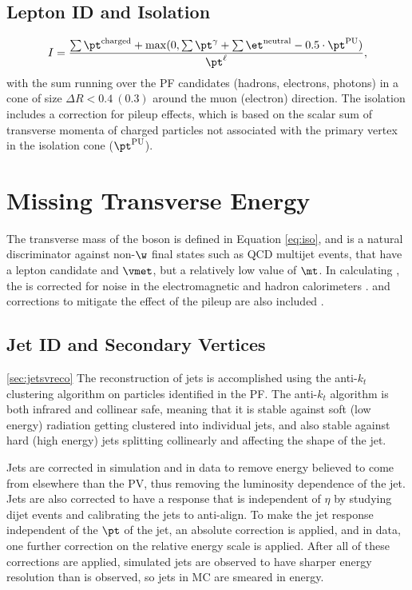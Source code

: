 \subsection{Lepton ID and Isolation}

\begin{equation}
\label{eq:iso}
I =\frac{ \sum\pt^{\mathrm{charged}}+{\mathrm{max}}(0,\sum\pt^{\gamma}+\sum\et^{\mathrm{neutral}}-0.5\cdot\pt^{\mathrm{PU}})}{\pt^\ell},
\end{equation}
 with the sum running over the PF candidates (hadrons, electrons, photons)
 in a cone of size $\Delta R < 0.4~(0.3)$ around the muon (electron) direction.
The isolation includes a correction for pileup effects,
 which is based on the scalar sum of transverse momenta of charged particles
 not associated with the primary vertex in the isolation cone 
 ($\pt^{\mathrm{PU}}$).


\section{Missing Transverse Energy}

The transverse mass of the \w boson
 is defined in Equation \ref{eq:iso},
 and is a  natural discriminator against non-$\w$ final states
 such as QCD multijet events,
 that have a lepton candidate and $\vmet$,
 but a relatively low value of $\mt$.
In calculating \mt, the \met is corrected for noise in the
 electromagnetic and hadron calorimeters \cite{WZCMS:2010}.
 and corrections to mitigate the effect of the
 pileup are also included \cite{CMS:8TeVMET}.


\subsection{Jet ID and Secondary Vertices}\ref{sec:jetsvreco}
 The reconstruction
  of jets is accomplished using the anti-$k_t$
  clustering algorithm on particles identified 
  in the PF. 
 The anti-$k_t$ algorithm is both infrared and collinear
  safe, meaning that it is stable against 
  soft (low energy) radiation getting clustered into individual jets, and 
  also stable against hard (high energy) jets splitting
  collinearly and affecting the shape of the jet.
 
 Jets are corrected in simulation and in data to remove
  energy believed to come from elsewhere than the PV, 
  thus removing the luminosity dependence of the jet.
 Jets are also corrected to have a response that is
  independent of $\eta$ by studying dijet events
  and calibrating the jets to anti-align.
 To make the jet response independent of the $\pt$
  of the jet, an absolute correction is applied,
  and in data, one further correction on the relative
  energy scale is applied.
 After all of these corrections are applied, 
  simulated jets are observed to have
  sharper energy resolution than is observed,
  so jets in MC are smeared in energy.

